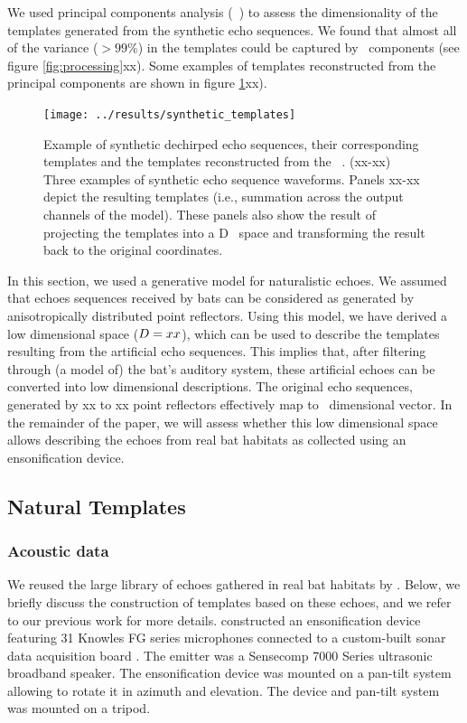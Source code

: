 \documentclass[preprint,5p]{elsarticle}
\begin{document}
We used principal components analysis (\PCA\ ) to assess the dimensionality of the templates generated from the synthetic echo sequences. We found that almost all of the variance ($> 99\%$) in the templates could be captured by \pca\ components (see figure \ref{fig:processing}xx). Some examples of templates reconstructed from the principal components are shown in figure \ref{fig:synthetictemplates}xx).

\begin{figure}[tb]
	\centering
	\texttt{[image: ../results/synthetic\_templates]}
	\caption{Example of synthetic dechirped echo sequences, their corresponding templates and the templates reconstructed from the \pca\ \pcs. (xx-xx) Three examples of synthetic echo sequence waveforms. Panels xx-xx depict the resulting templates (i.e., summation across the output channels of the \citet{Wiegrebe2008} model). These panels also show the result of projecting the templates into a \pca D \pc\ space and transforming the result back to the original coordinates.}
	\label{fig:synthetictemplates}
\end{figure}

In this section, we  used a generative model for naturalistic echoes. We assumed that echoes sequences received by bats can be considered as generated by anisotropically distributed point reflectors. Using this model, we have derived a low dimensional space ($D = xx$), which can be used to describe the templates resulting from the artificial echo sequences. This implies that, after filtering through (a model of) the bat's auditory system, these artificial echoes can be converted into low dimensional descriptions. The original echo sequences, generated by xx to xx point reflectors effectively map to \pca\ dimensional vector. In the remainder of the paper, we will assess whether this low dimensional space allows describing the echoes from real bat habitats as collected using an ensonification device.

\subsection{Natural Templates}

\subsubsection{Acoustic data}

We reused the large library of echoes gathered in real bat habitats by \citet{Vanderelst2016}. Below, we briefly discuss the construction of templates based on these echoes, and we refer to our previous work for more details. \citet{Vanderelst2016} constructed an ensonification device featuring 31 Knowles FG series microphones connected to a custom-built sonar data acquisition board \citep{Steckel2013a}. The emitter was a Sensecomp 7000 Series ultrasonic broadband speaker. The ensonification device was mounted on a pan-tilt system allowing to rotate it in azimuth and elevation. The device and pan-tilt system was mounted on a tripod.
\end{document}

